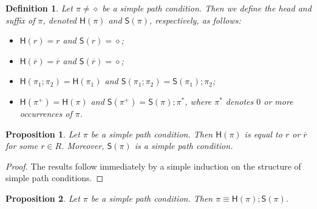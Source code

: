 \documentclass{article}
\newtheorem{definition}{Definition}
\newtheorem{proposition}{Proposition}
\newcommand{\hd}[1]{\mathsf{H}(#1)}
\newcommand{\tl}[1]{\mathsf{S}(#1)}
\newcommand{\comp}{\mathbin{;}}
\begin{document}
\begin{definition}\label{def:HeadAndSuffix}
Let $\pi \ne \diamond$ be a simple path condition.
Then we define the \emph{head} and \emph{suffix} of $\pi$, denoted $\hd{\pi}$ and $\tl{\pi}$, respectively, as follows:
\begin{itemize}
 \item $\hd{r} = r$ and $\tl{r} = \diamond$;
 \item $\hd{\overline{r}} = \overline{r}$ and $\tl{\overline{r}} = \diamond$;
 \item $\hd{\pi_1 \comp \pi_2} = \hd{\pi_1}$ and $\tl{\pi_1 \comp \pi_2} = \tl{\pi_1} \comp \pi_2$;
 \item $\hd{\pi^+} = \hd{\pi}$ and $\tl{\pi^+} = \tl{\pi} \comp \pi^*$, where $\pi^*$ denotes $0$ or more occurrences of $\pi$.
\end{itemize}
\end{definition}

\begin{proposition}\label{def:head-path-condition-equals-edge}
 Let $\pi$ be a simple path condition.
 Then $\hd{\pi}$ is equal to $r$ or $\overline{r}$ for some $r \in R$.
 Moreover, $\tl{\pi}$ is a simple path condition.
\end{proposition}

\begin{proof}
 The results follow immediately by a simple induction on the structure of simple path conditions.
\end{proof}


\begin{proposition}\label{pro:path-condition-equiv-head-comp-suffix}
 Let $\pi$ be a simple path condition.
 Then $\pi \equiv \hd{\pi} \comp \tl{\pi}$.
\end{proposition}
\end{document}
